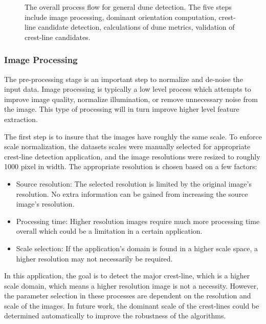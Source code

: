  \begin{figure}[H]
 	\centering
 	\caption{The overall process flow for general dune detection. The five steps include image processing, dominant orientation computation, crest-line candidate detection, calculations of dune metrics, validation of crest-line candidates.}
 	\label{fig:main_flow}
 \end{figure}

\subsubsection*{Image Processing}

The pre-processing stage is an important step to normalize and de-noise the input data. Image processing is typically a low level process which attempts to improve image quality, normalize illumination, or remove unnecessary noise from the image. This type of processing will in turn improve higher level feature extraction.

The first step is to insure that the images have roughly the same scale. To enforce scale normalization, the datasets scales were manually selected for appropriate crest-line detection application, and the image resolutions were resized to roughly 1000 pixel in width. The appropriate resolution is chosen based on a few factors:

\begin{itemize}
	\item Source resolution: The selected resolution is limited by the original image's resolution. No extra information can be gained from increasing the source image's resolution.
	\item Processing time: Higher resolution images require much more processing time overall which could be a limitation in a certain application.
	\item Scale selection: If the application's domain is found in a higher scale space, a higher resolution may not necessarily be required.
\end{itemize}

In this application, the goal is to detect the major crest-line, which is a higher scale domain, which means a higher resolution image is not a necessity. However, the parameter selection in these processes are dependent on the resolution and scale of the images. In future work, the dominant scale of the crest-lines could be determined automatically to improve the robustness of the algorithms.

